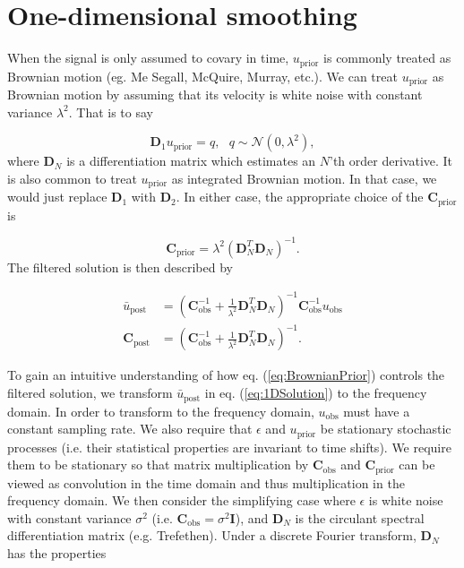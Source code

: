 \documentclass[10pt,a4paper]{article}
\begin{document}
\section*{One-dimensional smoothing}
When the signal is only assumed to covary in time, $u_\mathrm{prior}$ is commonly treated as Brownian motion (eg. Me Segall, McQuire, Murray, etc.).  We can treat $u_\mathrm{prior}$ as Brownian motion by assuming that its velocity is white noise with constant variance $\lambda^2$. That is to say

\begin{equation}
  \mathbf{D}_1 u_\mathrm{prior} = q, \ \ \ q \sim \mathcal{N}(0,\lambda^2),
\end{equation}     
where $\mathbf{D}_N$ is a differentiation matrix which estimates an $N$'th order derivative. It is also common to treat $u_\mathrm{prior}$ as integrated Brownian motion. In that case, we would just replace $\mathbf{D}_1$ with $\mathbf{D}_2$. In either case, the appropriate choice of the $\mathbf{C}_\mathrm{prior}$ is   

\begin{equation}\label{eq:BrownianPrior}
\mathbf{C_\mathrm{prior}} = \lambda^2(\mathbf{D}_N^T\mathbf{D}_N)^{-1}.
\end{equation}
The filtered solution is then described by

\begin{equation}\label{eq:1DSolution}
\begin{split}
\bar{u}_\mathrm{post} &= (\mathbf{C}_\mathrm{obs}^{-1} +   
                   \frac{1}{\lambda^2}\mathbf{D}_N^T\mathbf{D}_N)^{-1}\mathbf{C}_\mathrm{obs}^{-1}
                   u_\mathrm{obs}
\\
\mathbf{C}_\mathrm{post} &= (\mathbf{C}_\mathrm{obs}^{-1} +   
                            \frac{1}{\lambda^2}\mathbf{D}_N^T\mathbf{D}_N)^{-1}.
\end{split}
\end{equation}

To gain an intuitive understanding of how eq. (\ref{eq:BrownianPrior}) controls the filtered solution, we transform $\bar{u}_\mathrm{post}$ in eq. (\ref{eq:1DSolution}) to the frequency domain.  In order to transform to the frequency domain, $u_\mathrm{obs}$ must have a constant sampling rate. We also require that $\epsilon$ and $u_\mathrm{prior}$ be stationary stochastic processes (i.e. their statistical properties are invariant to time shifts).  We require them to be stationary so that matrix multiplication by $\mathbf{C}_\mathrm{obs}$ and $\mathbf{C}_\mathrm{prior}$ can be viewed as convolution in the time domain and thus multiplication in the frequency domain.  We then consider the simplifying case where $\epsilon$ is white noise with constant variance $\sigma^2$ (i.e. $\mathbf{C}_\mathrm{obs} = \sigma^2\mathbf{I}$), and $\mathbf{D}_N$ is the circulant spectral differentiation matrix (e.g. Trefethen).  Under a discrete Fourier transform, $\mathbf{D}_N$ has the properties
\end{document}
